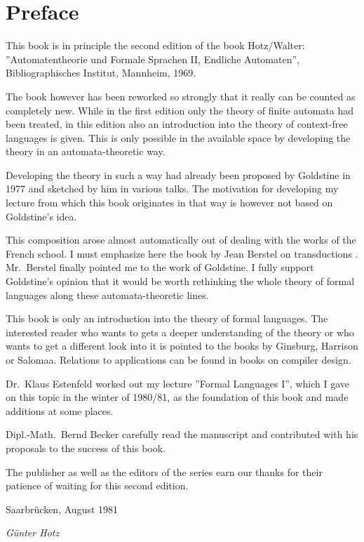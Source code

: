 \chapter*{Preface}

This book is in principle the second edition of the book Hotz/Walter:
''Automatentheorie und Formale Sprachen II, Endliche Automaten'',
Bibliographisches Institut, Mannheim, 1969.


The book however has been reworked so strongly that it really can be counted as
completely new. While in the first edition only the theory of finite automata
had been treated, in this edition also an introduction into the theory of context-free languages
is given. This is only possible in the available space by developing the theory
in an automata-theoretic way.

Developing the theory in such a way had already been proposed by Goldstine in
1977 \cite{Goldstine77} and sketched by him in various talks. The motivation
for developing my lecture from which this book originates in that way is however
not based on Goldstine's idea. 

This composition arose almost automatically out of dealing with the works of the
French school. I must emphasize here the book by Jean Berstel on transductions
\cite{Berstel79}. Mr.\ Berstel finally pointed me to the work of Goldstine. I
fully support Goldstine's opinion that it would be worth rethinking the whole theory
 of formal languages along these automata-theoretic lines.


This book is only an introduction into the theory of formal languages. The
interested reader who wants to gets a deeper understanding of the theory or who
wants to get a different look into it is pointed to the books by Ginsburg,
Harrison or Salomaa. Relations to applications can be found in books on compiler
design.

Dr.\ Klaus Estenfeld worked out my lecture ''Formal Languages I'', which I gave 
on this topic in the winter of 1980/81, as the foundation of this
book and made additions at some places.

Dipl.-Math.\ Bernd Becker carefully read the manuscript and contributed with his
proposals to the success of this book.

The publisher as well as the editors of the series earn our thanks for their
patience of waiting for this second edition.

Saarbrücken, August 1981

{\em Günter Hotz}

